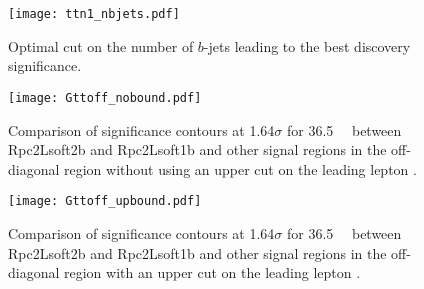 \begin{figure} 
\centering  
\texttt{[image: ttn1\_nbjets.pdf]} 
\caption{Optimal cut on the number of $b$-jets leading to the best discovery significance.}
\label{fig:SR_Gtt_bjets}
\end{figure}  



\begin{figure} 
\centering  
\texttt{[image: Gttoff\_nobound.pdf]} 
\caption{Comparison of significance contours at 1.64$\sigma$ for 36.5~\ifb~ between Rpc2Lsoft2b and Rpc2Lsoft1b and other signal regions in the off-diagonal region without using an upper cut on the leading lepton \pt.}
\label{fig:SR_Gtt_bjets.no}
\end{figure}  


\begin{figure} 
\centering  
\texttt{[image: Gttoff\_upbound.pdf]} 
\caption{Comparison of significance contours at 1.64$\sigma$ for 36.5~\ifb~ between Rpc2Lsoft2b and Rpc2Lsoft1b and other signal regions in the off-diagonal region with an upper cut on the leading lepton \pt.}
\label{fig:SR_Gtt_bjets.yes}
\end{figure}  




